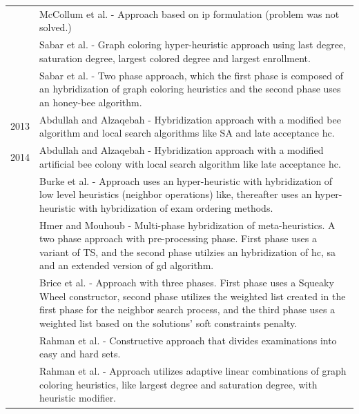 \begin{table}
\begin{tabular}{@{\,}r <{\hskip 2pt} !{\foo} >{\raggedright\arraybackslash}p{15cm}}
		& McCollum et al. - Approach based on \gls{ip} formulation (problem was not solved.)\\
		& Sabar et al. - Graph coloring hyper-heuristic approach using last degree, saturation degree, largest colored degree and largest enrollment.\\
		& Sabar et al. - Two phase approach, which the first phase is composed of an hybridization of graph coloring heuristics and the second phase uses an honey-bee algorithm.\\
2013	& Abdullah and Alzaqebah - Hybridization approach with a modified bee algorithm and local search algorithms like SA and late acceptance \gls{hc}.\\
2014	& Abdullah and Alzaqebah - Hybridization approach with a modified artificial bee colony with local search algorithm like late acceptance \gls{hc}.\\
		& Burke et al. - Approach uses an hyper-heuristic with hybridization of low level heuristics (neighbor operations) like, thereafter uses an hyper-heuristic with hybridization of exam ordering methods.\\
		& Hmer and Mouhoub - Multi-phase hybridization of meta-heuristics. A two phase approach with pre-processing phase. First phase uses a variant of TS, and the second phase utilzies an hybridization of \gls{hc}, \gls{sa} and an extended version of \gls{gd} algorithm.\\
		& Brice et al. - Approach with three phases. First phase uses a Squeaky Wheel constructor, second phase utilizes the weighted list created in the first phase for the neighbor search process, and the third phase uses a weighted list based on the solutions' soft constraints penalty.\\
		& Rahman et al. - Constructive approach that divides examinations into easy and hard sets.\\
		& Rahman et al. - Approach utilizes adaptive linear combinations of graph coloring heuristics, like largest degree and saturation degree, with heuristic modifier.\\
		
\end{tabular}
\end{table}
